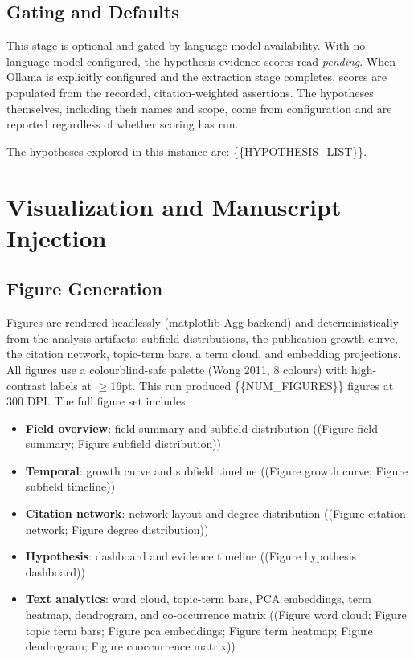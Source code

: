 \documentclass[
]{article}
\providecommand{\tightlist}{%
  \setlength{\itemsep}{0pt}\setlength{\parskip}{0pt}}
\begin{document}
\subsection{Gating and Defaults}\label{gating-and-defaults}

This stage is optional and gated by language-model availability. With no
language model configured, the hypothesis evidence scores read
\emph{pending}. When Ollama is explicitly configured and the extraction
stage completes, scores are populated from the recorded,
citation-weighted assertions. The hypotheses themselves, including their
names and scope, come from configuration and are reported regardless of
whether scoring has run.

The hypotheses explored in this instance are: \{\{HYPOTHESIS\_LIST\}\}.

\newpage

\section{Visualization and Manuscript
Injection}\label{visualization-and-manuscript-injection}

\subsection{Figure Generation}\label{figure-generation}

Figures are rendered headlessly (matplotlib Agg backend) and
deterministically from the analysis artifacts: subfield distributions,
the publication growth curve, the citation network, topic-term bars, a
term cloud, and embedding projections. All figures use a
colourblind-safe palette (Wong 2011, 8 colours) with high-contrast
labels at \(\geq 16\)pt. This run produced \{\{NUM\_FIGURES\}\} figures
at 300 DPI. The full figure set includes:

\begin{itemize}
\tightlist
\item
  \textbf{Field overview}: field summary and subfield distribution
  ((Figure field summary; Figure subfield distribution))
\item
  \textbf{Temporal}: growth curve and subfield timeline ((Figure growth
  curve; Figure subfield timeline))
\item
  \textbf{Citation network}: network layout and degree distribution
  ((Figure citation network; Figure degree distribution))
\item
  \textbf{Hypothesis}: dashboard and evidence timeline ((Figure
  hypothesis dashboard))
\item
  \textbf{Text analytics}: word cloud, topic-term bars, PCA embeddings,
  term heatmap, dendrogram, and co-occurrence matrix ((Figure word
  cloud; Figure topic term bars; Figure pca embeddings; Figure term
  heatmap; Figure dendrogram; Figure cooccurrence matrix))
\end{itemize}
\end{document}
